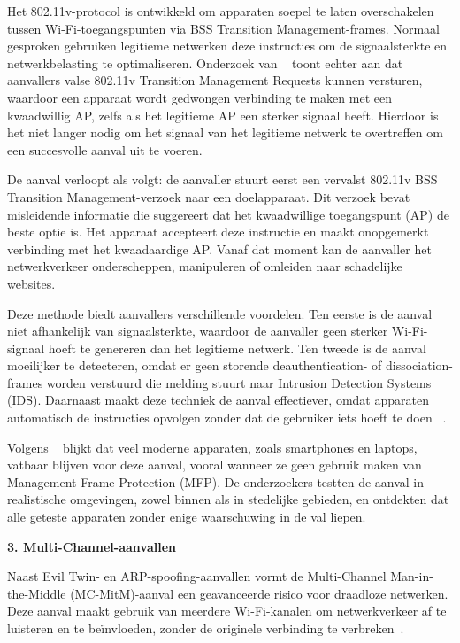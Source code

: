 Het 802.11v-protocol is ontwikkeld om apparaten soepel te laten overschakelen tussen Wi-Fi-toegangspunten via BSS Transition Management-frames. Normaal gesproken gebruiken legitieme netwerken deze instructies om de signaalsterkte en netwerkbelasting te optimaliseren. Onderzoek van ~\autocite{LOUCA2023} toont echter aan dat aanvallers valse 802.11v Transition Management Requests kunnen versturen, waardoor een apparaat wordt gedwongen verbinding te maken met een kwaadwillig AP, zelfs als het legitieme AP een sterker signaal heeft. Hierdoor is het niet langer nodig om het signaal van het legitieme netwerk te overtreffen om een succesvolle aanval uit te voeren.


De aanval verloopt als volgt: de aanvaller stuurt eerst een vervalst 802.11v BSS Transition Management-verzoek naar een doelapparaat. Dit verzoek bevat misleidende informatie die suggereert dat het kwaadwillige toegangspunt (AP) de beste optie is. Het apparaat accepteert deze instructie en maakt onopgemerkt verbinding met het kwaadaardige AP. Vanaf dat moment kan de aanvaller het netwerkverkeer onderscheppen, manipuleren of omleiden naar schadelijke websites.

Deze methode biedt aanvallers verschillende voordelen. Ten eerste is de aanval niet afhankelijk van signaalsterkte, waardoor de aanvaller geen sterker Wi-Fi-signaal hoeft te genereren dan het legitieme netwerk. Ten tweede is de aanval moeilijker te detecteren, omdat er geen storende deauthentication- of dissociation-frames worden verstuurd die melding stuurt naar Intrusion Detection Systems (IDS). Daarnaast maakt deze techniek de aanval effectiever, omdat apparaten automatisch de instructies opvolgen zonder dat de gebruiker iets hoeft te doen ~\autocite{LOUCA2023}.

Volgens ~\autocite{LOUCA2023} blijkt dat veel moderne apparaten, zoals smartphones en laptops, vatbaar blijven voor deze aanval, vooral wanneer ze geen gebruik maken van Management Frame Protection (MFP). De onderzoekers testten de aanval in realistische omgevingen, zowel binnen als in stedelijke gebieden, en ontdekten dat alle geteste apparaten zonder enige waarschuwing in de val liepen.


\vspace{0.5cm}
\textbf{3. Multi-Channel-aanvallen}


Naast Evil Twin- en ARP-spoofing-aanvallen vormt de Multi-Channel Man-in-the-Middle (MC-MitM)-aanval een geavanceerde risico voor draadloze netwerken. Deze aanval maakt gebruik van meerdere Wi-Fi-kanalen om netwerkverkeer af te luisteren en te beïnvloeden, zonder de originele verbinding te verbreken~\autocite{THANKAPPAN2022}.

